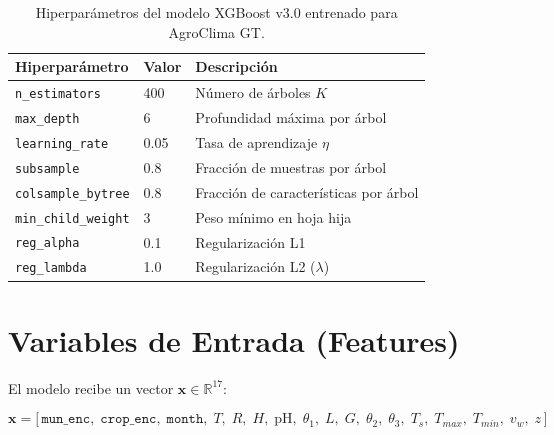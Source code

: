 \documentclass[12pt, a4paper]{article}
\begin{document}
\begin{table}[h!]
\centering
\begin{tabular}{lll}
\toprule
\textbf{Hiperparámetro} & \textbf{Valor} & \textbf{Descripción} \\
\midrule
\texttt{n\_estimators}      & 400  & Número de árboles $K$ \\
\texttt{max\_depth}         & 6    & Profundidad máxima por árbol \\
\texttt{learning\_rate}     & 0.05 & Tasa de aprendizaje $\eta$ \\
\texttt{subsample}          & 0.8  & Fracción de muestras por árbol \\
\texttt{colsample\_bytree}  & 0.8  & Fracción de características por árbol \\
\texttt{min\_child\_weight} & 3    & Peso mínimo en hoja hija \\
\texttt{reg\_alpha}         & 0.1  & Regularización L1 \\
\texttt{reg\_lambda}        & 1.0  & Regularización L2 ($\lambda$) \\
\bottomrule
\end{tabular}
\caption{Hiperparámetros del modelo XGBoost v3.0 entrenado para AgroClima GT.}
\end{table}

\section{Variables de Entrada (Features)}

El modelo recibe un vector $\mathbf{x} \in \mathbb{R}^{17}$:

\begin{equation}
  \mathbf{x} = \bigl[\,\texttt{mun\_enc},\; \texttt{crop\_enc},\; \texttt{month},\;
    T,\; R,\; H,\; \text{pH},\; \theta_1,\; L,\; G,\; \theta_2,\; \theta_3,\;
    T_s,\; T_{max},\; T_{min},\; v_w,\; z\,\bigr]
  \label{eq:vector_features}
\end{equation}
\end{document}

